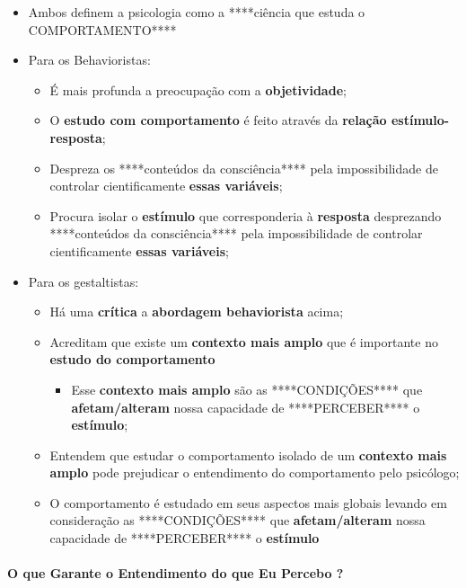 \documentclass[
]{book}
\providecommand{\tightlist}{%
  \setlength{\itemsep}{0pt}\setlength{\parskip}{0pt}}
\begin{document}
\begin{itemize}
\tightlist
\item
  Ambos definem a psicologia como a ****ciência que estuda o
  COMPORTAMENTO****
\item
  Para os Behavioristas:

  \begin{itemize}
  \tightlist
  \item
    É mais profunda a preocupação com a \textbf{objetividade};
  \item
    O \textbf{estudo com comportamento} é feito através da
    \textbf{relação estímulo-resposta};
  \item
    Despreza os ****conteúdos da consciência**** pela impossibilidade de
    controlar cientificamente \textbf{essas variáveis};
  \item
    Procura isolar o \textbf{estímulo} que corresponderia à
    \textbf{resposta} desprezando ****conteúdos da consciência**** pela
    impossibilidade de controlar cientificamente \textbf{essas
    variáveis};
  \end{itemize}
\item
  Para os gestaltistas:

  \begin{itemize}
  \tightlist
  \item
    Há uma \textbf{crítica} a \textbf{abordagem behaviorista} acima;
  \item
    Acreditam que existe um \textbf{contexto mais amplo} que é
    importante no \textbf{estudo do comportamento}

    \begin{itemize}
    \tightlist
    \item
      Esse \textbf{contexto mais amplo} são as ****CONDIÇÕES**** que
      \textbf{afetam/alteram} nossa capacidade de ****PERCEBER**** o
      \textbf{estímulo};
    \end{itemize}
  \item
    Entendem que estudar o comportamento isolado de um \textbf{contexto
    mais amplo} pode prejudicar o entendimento do comportamento pelo
    psicólogo;
  \item
    O comportamento é estudado em seus aspectos mais globais levando em
    consideração as ****CONDIÇÕES**** que \textbf{afetam/alteram} nossa
    capacidade de ****PERCEBER**** o \textbf{estímulo}
  \end{itemize}
\end{itemize}

\hypertarget{o-que-garante-o-entendimento-do-que-eu-percebo}{%
\paragraph{O que Garante o Entendimento do que Eu Percebo
?}\label{o-que-garante-o-entendimento-do-que-eu-percebo}}
\end{document}
